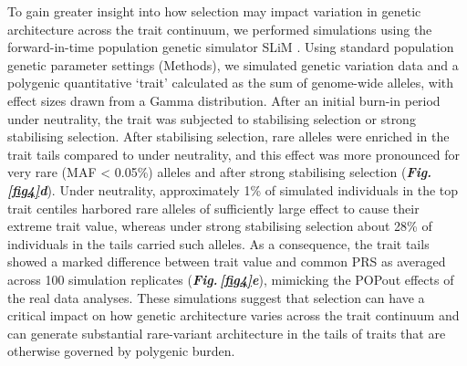 \documentclass[12pt]{zHenriquesLab-StyleBioRxiv}
\newcommand\dref[2]{\normalsize{\textbf{\textit{Fig.\,\ref{#1}#2}}}\normalsize{}}
\begin{document}
To gain greater insight into how selection may impact variation 
in genetic architecture across the trait continuum, we 
performed simulations using the forward-in-time population 
genetic simulator SLiM \cite{BC_2019}. Using standard population 
genetic parameter settings (Methods), we simulated genetic variation 
data and a polygenic quantitative ‘trait’ calculated as the sum of genome-wide alleles, 
with effect sizes drawn from a Gamma distribution. After an initial 
burn-in period under neutrality, the trait was subjected to stabilising selection or strong 
stabilising selection. After stabilising selection, rare alleles 
were enriched in the trait tails compared to under neutrality, 
and this effect was more pronounced for very rare (MAF < 0.05\%) alleles and 
after strong stabilising selection (\dref{fig4}{d}). Under 
neutrality, approximately 1\% of simulated individuals in the 
top trait centiles harbored rare alleles of sufficiently large 
effect to cause their extreme trait value, whereas under strong
stabilising selection about 28\% of individuals in the tails 
carried such alleles. As a consequence, the trait tails showed a marked 
difference between trait value and common PRS as averaged across 
100 simulation replicates (\dref{fig4}{e}), mimicking the POPout effects 
of the real data analyses. These simulations suggest that selection can 
have a critical impact on how genetic architecture varies across the trait 
continuum and can generate substantial rare-variant architecture in the tails 
of traits that are otherwise governed by polygenic burden. 
\end{document}
